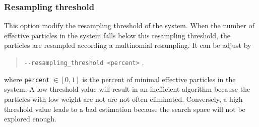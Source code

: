     \subsubsection*{Resampling threshold}
        This option modify the resampling threshold of the system. When the number of effective particles in the system falls below this resampling threshold, the particles are resampled according a multinomial resampling. It can be adjust by
            \begin{quote}
                \texttt{-\hspace{0.1mm}-resampling\_threshold <percent>} \enspace ,
            \end{quote}
        where \texttt{percent}$\;\in[0,1]$ is the percent of minimal effective particles in the system.
        A low threshold value will result in an inefficient algorithm because the particles with low weight are not are not often eliminated. Conversely, a high threshold value leads to a bad estimation because the search space will not be explored enough.
